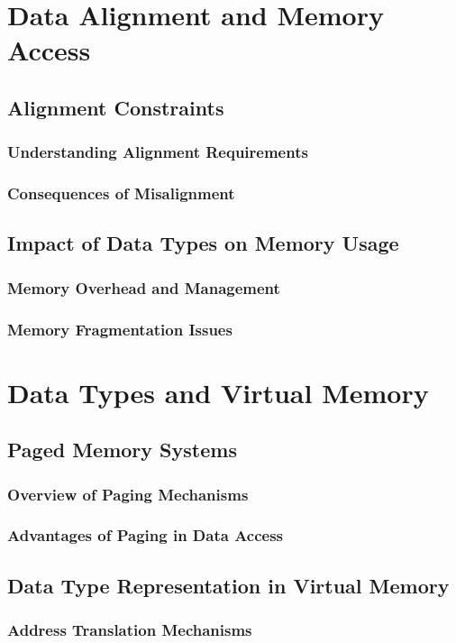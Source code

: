 \documentclass[12pt, oneside]{book}
\begin{document}
\section{Data Alignment and Memory Access}
\subsection{Alignment Constraints}
\subsubsection{Understanding Alignment Requirements}
\subsubsection{Consequences of Misalignment}
\subsection{Impact of Data Types on Memory Usage}
\subsubsection{Memory Overhead and Management}
\subsubsection{Memory Fragmentation Issues}
\section{Data Types and Virtual Memory}
\subsection{Paged Memory Systems}
\subsubsection{Overview of Paging Mechanisms}
\subsubsection{Advantages of Paging in Data Access}
\subsection{Data Type Representation in Virtual Memory}
\subsubsection{Address Translation Mechanisms}
\end{document}
